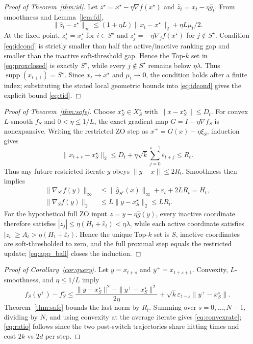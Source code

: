 \documentclass{article}
\newcommand{\supp}{\operatorname{supp}}
\newcommand{\eps}{\varepsilon}
\begin{document}
\medskip
\begin{proof}[Proof of Theorem~\ref{thm:id}]
Let $z^\star=x^\star-\eta\nabla f(x^\star)$ and $\widehat z_t=x_t-\eta\widehat g_t$. From smoothness and Lemma~\ref{lem:fd},
\begin{equation}
\|\widehat z_t-z^\star\|_\infty
\le (1+\eta L)\|x_t-x^\star\|_2+\eta L\mu_t/2.
\end{equation}
At the fixed point, $z_i^\star=x_i^\star$ for $i\in S^\star$ and $z_j^\star=-\eta\nabla_j f(x^\star)$ for $j\notin S^\star$. Condition \eqref{eq:idcond} is strictly smaller than half the active/inactive ranking gap and smaller than the inactive soft-threshold gap. Hence the Top-$k$ set in \eqref{eq:proxclosed} is exactly $S^\star$, while every $j\notin S^\star$ remains below $\eta\lambda$. Thus $\supp(x_{t+1})=S^\star$. Since $x_t\to x^\star$ and $\mu_t\to0$, the condition holds after a finite index; substituting the stated local geometric bounds into \eqref{eq:idcond} gives the explicit bound \eqref{eq:tid}.
\end{proof}

\medskip
\begin{proof}[Proof of Theorem~\ref{thm:safe}]
Choose $x_S^\star\in X_S^\star$ with $\|x-x_S^\star\|\le D_t$. For convex $L$-smooth $f_S$ and $0<\eta\le 1/L$, the exact gradient map $G=I-\eta\nabla f_S$ is nonexpansive. Writing the restricted ZO step as $x^+=G(x)-\eta\xi_S$, induction gives
\begin{equation}
\|x_{t+s}-x_S^\star\|_2
\le D_t+\eta\sqrt{k}\sum_{j=0}^{s-1}\eps_{t+j}\le R_t.
\label{eq:app_ball}
\end{equation}
Thus any future restricted iterate $y$ obeys $\|y-x\|\le2R_t$. Smoothness then implies
\begin{align}
\|\nabla_{S^c} f(y)\|_\infty&\le \|\widehat g_{S^c}(x)\|_\infty+\eps_t+2LR_t=H_t,\\
\|\nabla_S f(y)\|_2&\le L\|y-x_S^\star\|_2\le LR_t.
\end{align}
For the hypothetical full ZO input $z=y-\eta\widehat g(y)$, every inactive coordinate therefore satisfies
$|z_j|\le\eta(H_t+\bar\eps_t)<\eta\lambda$, while each active coordinate satisfies
$|z_i|\ge A_t>\eta(H_t+\bar\eps_t)$. Hence the unique Top-$k$ set is $S$, inactive coordinates are soft-thresholded to zero, and the full proximal step equals the restricted update; \eqref{eq:app_ball} closes the induction.
\end{proof}

\medskip
\begin{proof}[Proof of Corollary~\ref{cor:query}]
Let $y=x_{t+s}$ and $y^+=x_{t+s+1}$. Convexity, $L$-smoothness, and $\eta\le1/L$ imply
\begin{equation}
f_S(y^+)-f_S^\star
\le \frac{\|y-x_S^\star\|^2-\|y^+-x_S^\star\|^2}{2\eta}
+\sqrt{k}\eps_{t+s}\|y^+-x_S^\star\|.
\end{equation}
Theorem~\ref{thm:safe} bounds the last norm by $R_t$. Summing over $s=0,\ldots,N-1$, dividing by $N$, and using convexity at the average iterate gives \eqref{eq:convexrate}; \eqref{eq:ratio} follows since the two post-switch trajectories share hitting times and cost $2k$ vs $2d$ per step.
\end{proof}
\end{document}
